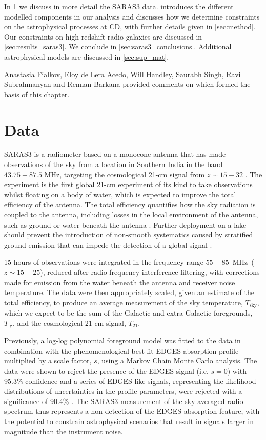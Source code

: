 In \cref{sec:data_saras3} we discuss in more detail the SARAS3 data.  introduces the different modelled components in our analysis and discusses how we determine constraints on the astrophysical processes at CD, with further details given in \cref{sec:method}. Our constraints on high-redshift radio galaxies are discussed in \cref{sec:results_saras3}. We conclude in \cref{sec:saras3_conclusions}. Additional astrophysical models are discussed in \cref{sec:sup_mat}. 

Anastasia Fialkov, Eloy de Lera Acedo, Will Handley, Saurabh Singh, Ravi Subrahmanyan and Rennan Barkana provided comments on \cite{Bevins_saras3_2022} which formed the basis of this chapter.

\section{Data} \label{sec:data_saras3}

SARAS3 is a radiometer based on a monocone antenna that has made observations of the sky from a location in Southern India in the band $43.75-87.5$ MHz, targeting the cosmological 21-cm signal from $z\sim 15-32$ %
\cite{SARAS3_spectrometer_2020,SARAS3_antenna_2021,SARAS_reciever_2021}. The experiment is the first global 21-cm experiment of its kind to take observations whilst floating on a body of water, which is expected to improve the total efficiency of the antenna. The total efficiency quantifies how the sky radiation is coupled to the antenna, including losses in the local environment of the antenna, such as ground or water beneath the antenna \cite{SARAS3_antenna_2021}. Further deployment on a lake should prevent the introduction of non-smooth systematics caused by stratified ground emission that can impede the detection of a global signal \cite{Bevins_SARAS2_2022}.

15 hours of observations were integrated in the frequency range $55-85$~MHz~($z\sim 15 - 25$), reduced after radio frequency interference filtering, with corrections made for emission from the water beneath the antenna and receiver noise temperature. The data were then appropriately scaled, given an estimate of the total efficiency,
to produce an average measurement of the sky temperature, $T_\mathrm{sky}$,  
which we expect to be the sum of the Galactic and extra-Galactic foregrounds, $T_\mathrm{fg}$, and the cosmological 21-cm signal, $T_{21}$.

Previously, a log-log polynomial foreground model was fitted to the data in combination with the phenomenological best-fit EDGES absorption profile multiplied by a scale factor, $s$, using a Markov Chain Monte Carlo analysis.
The data were shown to reject the presence of the EDGES signal (i.e. $s = 0$) with 95.3\% confidence and a series of EDGES-like signals, representing the likelihood distributions of uncertainties in the profile parameters, were rejected with a significance of 90.4\% \cite{SARAS3}. The SARAS3 measurement of the sky-averaged radio spectrum thus represents a non-detection of the EDGES absorption feature, with the potential to constrain astrophysical scenarios that result in signals larger in magnitude than the instrument noise.

